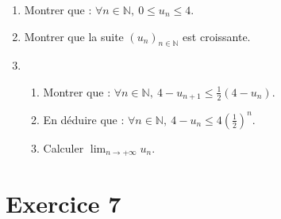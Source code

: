 \documentclass[12pt]{article}
\begin{document}
\begin{enumerate}
    \item Montrer que : \(\forall n \in \mathbb{N}, \ 0 \leq u_n \leq 4\).

    \item Montrer que la suite \((u_n)_{n \in \mathbb{N}}\) est croissante.

    \item 
    \begin{enumerate}
        \item Montrer que : \(\forall n \in \mathbb{N}, \ 4 - u_{n+1} \leq \frac{1}{2}(4 - u_n)\).
        \item En déduire que : \(\forall n \in \mathbb{N}, \ 4 - u_n \leq 4 \left(\frac{1}{2}\right)^n\).
        \item Calculer \(\lim_{n \to +\infty} u_n\).
    \end{enumerate}
\end{enumerate}

\section*{Exercice 7}
\end{document}
